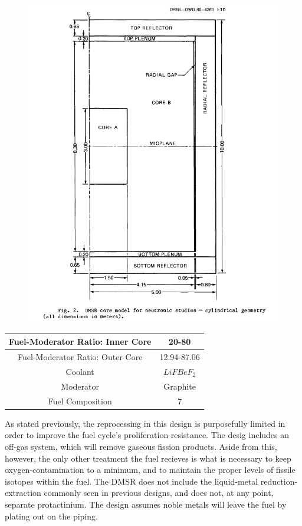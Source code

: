 \documentclass[letterpaper]{article}
\begin{document}
\begin{figure}[H]
  \centering
  \includegraphics[width=1.0\linewidth]{figures/DMSRsource1.png}
  \label{fig:fig7}
\end{figure}

\begin{center}
\begin{tabular}{|c|c|}
\hline
Fuel-Moderator Ratio: Inner Core & 20-80 \\
\hline
Fuel-Moderator Ratio: Outer Core & 12.94-87.06  \\
\hline
Coolant & $LiFBeF_2$ \\
\hline
Moderator & Graphite \\
\hline
Fuel Composition & 7 \\
\hline
\end{tabular}
\end{center}

As stated previously, the reprocessing in this design is purposefully limited in order to improve the fuel cycle's proliferation resistance.  The desig includes an off-gas system, which will remove gaseous fission products.  Aside from this, however, the only other treatment the fuel recieves is what is necessary to keep oxygen-contamination to a minimum, and to maintain the proper levels of fissile isotopes within the fuel.  The DMSR does not include the liquid-metal reduction-extraction commonly seen in previous designs, and does not, at any point, separate protactinium.  The design assumes noble metals will leave the fuel by plating out on the piping.
\end{document}
